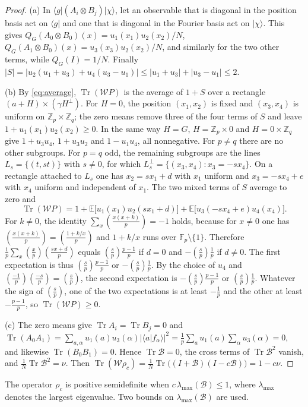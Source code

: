 \documentclass[11pt,a4paper]{article}
\theoremstyle{definition}
\theoremstyle{plain}
\DeclareMathOperator{\Tr}{Tr}
\newcommand{\Z}{\mathbb Z}
\newcommand{\F}{\mathbb F}
\newcommand{\B}{\mathcal B}
\newcommand{\Wc}{\mathcal W}
\newcommand{\ket}[1]{\lvert#1\rangle}
\newcommand{\bra}[1]{\langle#1\rvert}
\newcommand{\leg}[2]{\left(\frac{#1}{#2}\right)}
\begin{document}
\begin{proof}
(a) In $\bra g(A_i\otimes B_j)\ket\chi$, let an observable that is diagonal
in the position basis act on $\bra g$ and one that is diagonal in the Fourier
basis act on $\ket\chi$. This gives
$Q_G(A_0\otimes B_0)(x)=u_1(x_1)u_2(x_2)/N$,
$Q_G(A_1\otimes B_0)(x)=u_3(x_3)u_2(x_2)/N$, and similarly for the two other
terms, while $Q_G(I)=1/N$. Finally
$|S|=|u_2(u_1+u_3)+u_4(u_3-u_1)|\leq|u_1+u_3|+|u_3-u_1|\leq2$.

(b) By \eqref{eq:average}, $\Tr(\Wc P)$ is the average of $1+S$ over a
rectangle $(a+H)\times(\gamma H^\perp)$. For $H=0$, the position $(x_1,x_2)$
is fixed and $(x_3,x_4)$ is uniform on $\Z_p\times\Z_q$; the zero means
remove three of the four terms of $S$ and leave $1+u_1(x_1)u_2(x_2)\geq0$.
In the same way $H=G$, $H=\Z_p\times0$ and $H=0\times\Z_q$ give
$1+u_3u_4$, $1+u_3u_2$ and $1-u_1u_4$, all nonnegative. For $p\neq q$ there
are no other subgroups. For $p=q$ odd, the remaining subgroups are the lines
$L_s=\{(t,st)\}$ with $s\neq0$, for which $L_s^\perp=\{(x_3,x_4):x_3=-sx_4\}$.
On a rectangle attached to $L_s$ one has $x_2=sx_1+d$ with $x_1$ uniform and
$x_3=-sx_4+e$ with $x_4$ uniform and independent of $x_1$. The two mixed
terms of $S$ average to zero and
\[
 \Tr(\Wc P)=1+\mathbb E\bigl[u_1(x_1)u_2(sx_1+d)\bigr]
 +\mathbb E\bigl[u_3(-sx_4+e)u_4(x_4)\bigr].
\]
For $k\neq0$, the identity $\sum_x\leg{x(x+k)}{p}=-1$ holds, because for
$x\neq0$ one has $\leg{x(x+k)}{p}=\leg{1+k/x}{p}$ and $1+k/x$ runs over
$\F_p\setminus\{1\}$. Therefore $\frac1p\sum_x\leg xp\leg{sx+d}p$ equals
$\leg sp\frac{p-1}p$ if $d=0$ and $-\leg sp\frac1p$ if $d\neq0$. The first
expectation is thus $\leg sp\frac{p-1}p$ or $-\leg sp\frac1p$. By the choice
of $u_4$ and $\leg{-1}p\leg{-s}p=\leg sp$, the second expectation is
$-\leg sp\frac{p-1}p$ or $\leg sp\frac1p$. Whatever the sign of $\leg sp$,
one of the two expectations is at least $-\frac1p$ and the other at least
$-\frac{p-1}p$, so $\Tr(\Wc P)\geq0$.

(c) The zero means give $\Tr A_i=\Tr B_j=0$ and
$\Tr(A_0A_1)=\sum_{a,\alpha}u_1(a)u_3(\alpha)|\langle a|f_\alpha\rangle|^2
=\frac1p\sum_au_1(a)\sum_\alpha u_3(\alpha)=0$, and likewise $\Tr(B_0B_1)=0$.
Hence $\Tr\B=0$, the cross terms of $\Tr\B^2$ vanish, and
$\frac1N\Tr\B^2=\nu$. Then
$\Tr(\Wc\rho_c)=\frac1N\Tr\bigl((I+\B)(I-c\B)\bigr)=1-c\nu$.
\end{proof}

The operator $\rho_c$ is positive semidefinite when
$c\,\lambda_{\max}(\B)\leq1$, where $\lambda_{\max}$ denotes the largest
eigenvalue. Two bounds on $\lambda_{\max}(\B)$ are used.
\end{document}
